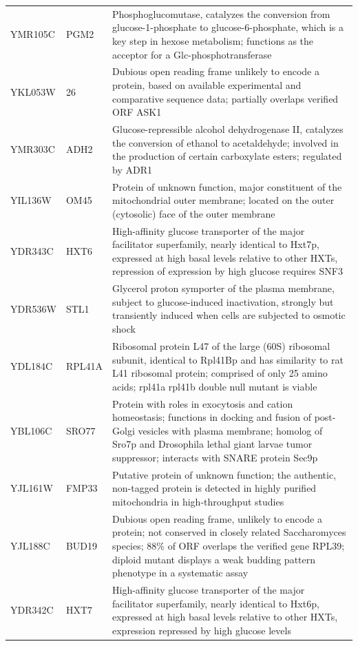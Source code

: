 \documentclass[letter]{article}\usepackage{graphicx, color}
\begin{document}
\begin{longtable}{lll}
  YMR105C & PGM2 & Phosphoglucomutase, catalyzes the conversion from glucose-1-phosphate to glucose-6-phosphate, which is a key step in hexose metabolism; functions as the acceptor for a Glc-phosphotransferase \\ 
  YKL053W & 26 & Dubious open reading frame unlikely to encode a protein, based on available experimental and comparative sequence data; partially overlaps verified ORF ASK1 \\ 
  YMR303C & ADH2 & Glucose-repressible alcohol dehydrogenase II, catalyzes the conversion of ethanol to acetaldehyde; involved in the production of certain carboxylate esters; regulated by ADR1 \\ 
  YIL136W & OM45 & Protein of unknown function, major constituent of the mitochondrial outer membrane; located on the outer (cytosolic) face of the outer membrane \\ 
  YDR343C & HXT6 & High-affinity glucose transporter of the major facilitator superfamily, nearly identical to Hxt7p, expressed at high basal levels relative to other HXTs, repression of expression by high glucose requires SNF3 \\ 
  YDR536W & STL1 & Glycerol proton symporter of the plasma membrane, subject to glucose-induced inactivation, strongly but transiently induced when cells are subjected to osmotic shock \\ 
  YDL184C & RPL41A & Ribosomal protein L47 of the large (60S) ribosomal subunit, identical to Rpl41Bp and has similarity to rat L41 ribosomal protein; comprised of only 25 amino acids; rpl41a rpl41b double null mutant is viable \\ 
  YBL106C & SRO77 & Protein with roles in exocytosis and cation homeostasis; functions in docking and fusion of post-Golgi vesicles with plasma membrane; homolog of Sro7p and Drosophila lethal giant larvae tumor suppressor; interacts with SNARE protein Sec9p \\ 
  YJL161W & FMP33 & Putative protein of unknown function; the authentic, non-tagged protein is detected in highly purified mitochondria in high-throughput studies \\ 
  YJL188C & BUD19 & Dubious open reading frame, unlikely to encode a protein; not conserved in closely related Saccharomyces species; 88\% of ORF overlaps the verified gene RPL39; diploid mutant displays a weak budding pattern phenotype in a systematic assay \\ 
  YDR342C & HXT7 & High-affinity glucose transporter of the major facilitator superfamily, nearly identical to Hxt6p, expressed at high basal levels relative to other HXTs, expression repressed by high glucose levels \\ 

\end{longtable}
\end{document}
